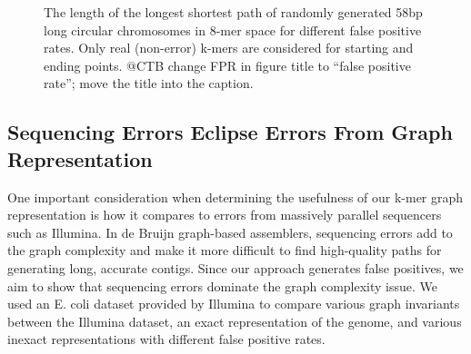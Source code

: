 \documentclass[12pt]{article} \usepackage{simplemargins}
\begin{document}
\begin{figure}
\caption{The length of the longest shortest path of randomly generated 58bp 
long circular chromosomes in 8-mer 
space for different false positive rates. Only real (non-error) k-mers are
considered for starting and ending points.  @CTB change FPR in figure title to ``false positive rate''; move the title into the caption.}
\end{figure}

\subsection{Sequencing Errors Eclipse Errors From Graph Representation}
One important consideration when determining the usefulness of our k-mer
graph representation is how it compares to errors from massively
parallel sequencers such as Illumina. In de Bruijn graph-based
assemblers, sequencing errors add to the graph complexity and make it
more difficult to find high-quality paths for generating long,
accurate contigs. Since our approach generates
false positives, we aim to show that sequencing errors dominate the graph complexity
issue. We used an E. coli dataset provided by Illumina to compare
various graph invariants between the Illumina dataset, an exact
representation of the genome, and various inexact representations with
different false positive rates.
\end{document}
